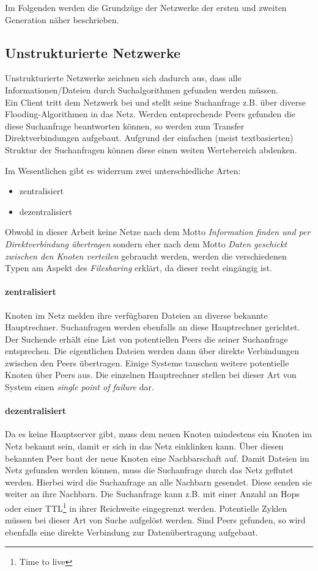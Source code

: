 Im Folgenden werden die Grundzüge der Netzwerke der ersten und zweiten Generation näher beschrieben.

\subsection{Unstrukturierte Netzwerke}
Unstrukturierte Netzwerke zeichnen sich dadurch aus, dass alle Informationen/Dateien durch Suchalgorithmen \cite{Lv2002} gefunden werden müssen. \\
Ein Client tritt dem Netzwerk bei und stellt seine Suchanfrage z.B. über diverse Flooding-Algorithmen in das Netz. Werden entsprechende Peers gefunden die diese Suchanfrage beantworten können, so werden zum Transfer Direktverbindungen aufgebaut. Aufgrund der einfachen (meist textbasierten) Struktur der Suchanfragen können diese einen weiten Wertebereich abdenken.

Im Wesentlichen gibt es widerrum zwei unterschiedliche Arten:
\begin{itemize}
\item zentralisiert
\item dezentralisiert
\end{itemize}

Obwohl in dieser Arbeit keine Netze nach dem Motto \emph{Information finden und per Direktverbindung übertragen} sondern eher nach dem Motto \emph{Daten geschickt zwischen den Knoten verteilen} gebraucht werden, werden die verschiedenen Typen am Aspekt des \emph{Filesharing} erklärt, da dieser recht eingängig ist.\\

\paragraph{zentralisiert} Knoten im Netz melden ihre verfügbaren Dateien an diverse bekannte Hauptrechner. Suchanfragen werden ebenfalls an diese Hauptrechner gerichtet. Der Suchende erhält eine List von potentiellen Peers die seiner Suchanfrage entsprechen. Die eigentlichen Dateien werden dann über direkte Verbindungen zwischen den Peers übertragen. Einige Systeme tauschen weitere potentielle Knoten über Peers aus. Die einzelnen Hauptrechner stellen bei dieser Art von System einen \emph{single point of failure} dar.

\paragraph{dezentralisiert} Da es keine Hauptserver gibt, muss dem neuen Knoten mindestens ein Knoten im Netz bekannt sein, damit er sich in das Netz einklinken kann. Über diesen bekannten Peer baut der neue Knoten eine Nachbarschaft auf. Damit Dateien im Netz gefunden werden können, muss die Suchanfrage durch das Netz geflutet werden. Hierbei wird die Suchanfrage an alle Nachbarn gesendet. Diese senden sie weiter an ihre Nachbarn. Die Suchanfrage kann z.B. mit einer Anzahl an Hops oder einer TTL\footnote{Time to live} in ihrer Reichweite eingegrenzt werden. Potentielle Zyklen müssen bei dieser Art von Suche aufgelöst werden. Sind Peers gefunden, so wird ebenfalls eine direkte Verbindung zur Datenübertragung aufgebaut.

